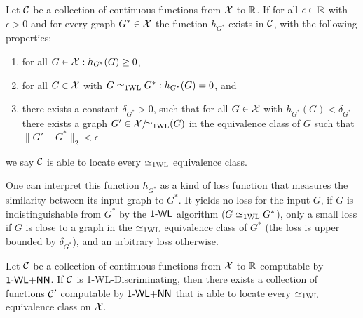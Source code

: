 \begin{definition}
    Let $\mathcal{C}$ be a collection of continuous functions from $\mathcal{X}$ to $\mathbb{R}$. If for all $\epsilon \in \mathbb{R}$ with $\epsilon > 0$ and for every graph $G^* \in \mathcal{X}$ the function $h_{G^*}$ exists in $\mathcal{C}$, with the following properties:
    \begin{enumerate}
        \item for all $G \in \mathcal{X}:  h_{G^*}(G) \geq 0$,
        \item for all $G \in \mathcal{X}$ with $G \simeq_{\text{1WL}} G^*: h_{G^*}(G)=0$, and
        \item there exists a constant $\delta_{G^*} > 0$, such that for all $G \in \mathcal{X}$ with $h_{G^*}(G) < \delta_{G^*}$ there exists a graph $G' \in \mathcal{X}/\!{\simeq_{\text{1WL}}}(G)$ in the equivalence class of $G$ such that $\| G' - G^* \|_2 < \epsilon$
    \end{enumerate}
    we say $\mathcal{C}$ is able to locate every $\simeq_{\text{1WL}}$ equivalence class.
\end{definition}

One can interpret this function $h_{G^*}$ as a kind of loss function that measures the similarity between its input graph to $G^*$. It yields no loss for the input $G$, if $G$ is indistinguishable from $G^*$ by the $\textsf{1-WL}$ algorithm ($G \simeq_{\text{1WL}} G^*$), only a small loss if $G$ is close to a graph in the $\simeq_{\text{1WL}}$ equivalence class of $G^*$ (the loss is upper bounded by $\delta_{G^*}$), and an arbitrary loss otherwise.

\begin{lemma}\label{lem:continuous_proof1}
    Let $\mathcal{C}$ be a collection of continuous functions from $\mathcal{X}$ to $\mathbb{R}$ computable by $\textsf{1-WL+NN}$. If $\mathcal{C}$ is 1-\!WL-Discriminating, then there exists a collection of functions $\mathcal{C}'$ computable by $\textsf{1-WL+NN}$ that is able to locate every $\simeq_{\text{1WL}}$ equivalence class on $\mathcal{X}$.
\end{lemma}


